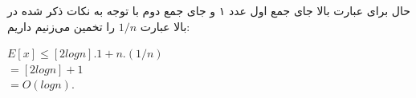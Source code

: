 {حال برای عبارت بالا جای جمع اول عدد ۱ و جای جمع دوم با توجه به نکات ذکر شده در بالا عبارت $1/n$ را تخمین می‌زنیم داریم:
\begin{LTR}
$E[x] \le [2logn].1 + n.(1/n) $ \\
$ = [2logn] + 1$ \\
$ = O(logn) $.
\end{LTR}

}










